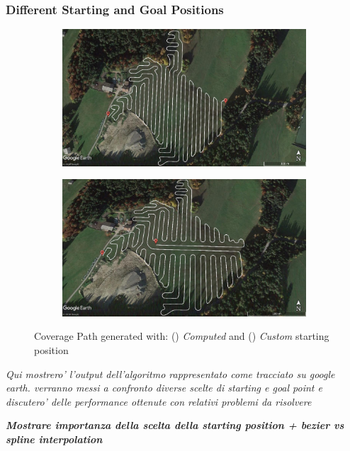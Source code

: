 \subsubsection{Different Starting and Goal Positions} %
\label{ssub:different_starting_and_goal_positions}


\begin{figure}[ht]
	\centering
	\begin{subfigure}{1\textwidth}
	  \centering
	  \includegraphics[width=.9\linewidth]{figures/C3/Field3/Field3-CoverageGE-BSpline-noBorder.jpg}
	  \caption{}
	  \label{sfig:F3-regular-start-pos}
	\end{subfigure}
	\begin{subfigure}{1\textwidth}
	  \centering
	  \includegraphics[width=.9\linewidth]{figures/C3/Field3/Field3-CoverageDifferentStartingPosition.jpg}
	  \caption{}
	  \label{sfig:F3-modified-start-pos}
	\end{subfigure}
	\caption{Coverage Path generated with: () \textit{Computed} and () \textit{Custom} starting position}
    \label{fig:SITL-architecture}
\end{figure}


\textit{Qui mostrero' l'output dell'algoritmo rappresentato come tracciato su google earth. verranno messi a confronto diverse scelte di starting e goal point e discutero' delle performance ottenute con relativi problemi da risolvere}

\textit{\textbf{Mostrare importanza della scelta della starting position + bezier vs spline interpolation}}
